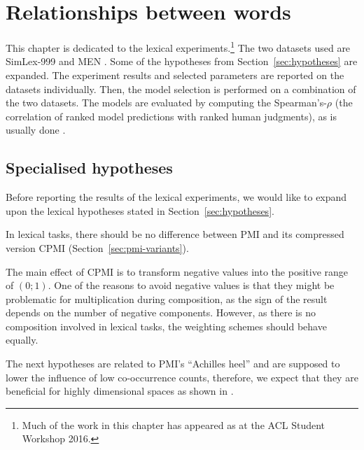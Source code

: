 \chapter{Relationships between words}
\label{sec:lexical}

This chapter is dedicated to the lexical experiments.\footnote{Much of the work in this chapter has appeared as  at the ACL Student Workshop 2016.} The two datasets used are  SimLex-999 \cite{hill2014simlex} and MEN \cite{Bruni:2014:MDS:2655713.2655714}. Some of the hypotheses from Section~\ref{sec:hypotheses} are expanded. The experiment results and selected parameters are reported on the datasets individually. Then, the model selection is performed on a combination of the two datasets. The models are evaluated by computing the Spearman's-$\rho$ (the correlation of ranked model predictions with ranked human judgments), as is usually done \cite{Bruni:2014:MDS:2655713.2655714,hill2014simlex}.\footnotemark{}


\section{Specialised hypotheses}
\label{sec:elab-hypoth-lexical}

Before reporting the results of the lexical experiments, we would like to expand upon the lexical hypotheses stated in Section~\ref{sec:hypotheses}.

\begin{hyp}
  \label{hyp:lex-pmi-cpmi}
  In lexical tasks, there should be no difference between PMI and its compressed version CPMI (Section~\ref{sec:pmi-variants}).
\end{hyp}

The main effect of CPMI is to transform negative values into the positive range of $(0; 1)$. One of the reasons to avoid negative values is that they might be problematic for multiplication during composition, as the sign of the result depends on the number of negative components. However, as there is no composition involved in lexical tasks, the weighting schemes should behave equally.

The next hypotheses are related to PMI's ``Achilles heel'' and are supposed to lower the influence of low co-occurrence counts, therefore, we expect that they are beneficial for highly dimensional spaces as shown in .

